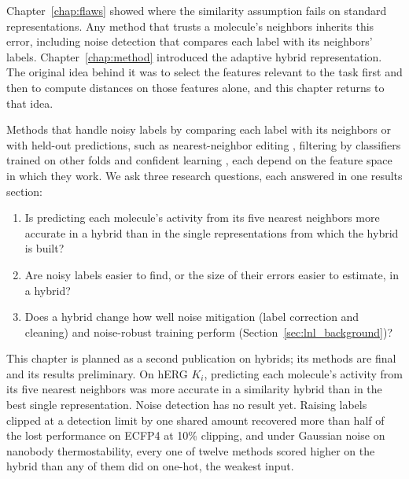 Chapter~\ref{chap:flaws} showed where the similarity assumption fails on standard representations. Any method that trusts a molecule's neighbors inherits this error, including noise detection that compares each label with its neighbors' labels. Chapter~\ref{chap:method} introduced the adaptive hybrid representation. The original idea behind it was to select the features relevant to the task first and then to compute distances on those features alone, and this chapter returns to that idea.

Methods that handle noisy labels by comparing each label with its neighbors or with held-out predictions, such as nearest-neighbor editing \citep{Wilson1972}, filtering by classifiers trained on other folds \citep{Brodley1999} and confident learning \citep{Northcutt2021}, each depend on the feature space in which they work. We ask three research questions, each answered in one results section:
\begin{enumerate}
    \item Is predicting each molecule's activity from its five nearest neighbors more accurate in a hybrid than in the single representations from which the hybrid is built?
    \item Are noisy labels easier to find, or the size of their errors easier to estimate, in a hybrid?
    \item Does a hybrid change how well noise mitigation (label correction and cleaning) and noise-robust training perform (Section~\ref{sec:lnl_background})?
\end{enumerate}

This chapter is planned as a second publication on hybrids; its methods are final and its results preliminary. On hERG $K_i$, predicting each molecule's activity from its five nearest neighbors was more accurate in a similarity hybrid than in the best single representation. Noise detection has no result yet. Raising labels clipped at a detection limit by one shared amount recovered more than half of the lost performance on ECFP4 at 10\% clipping, and under Gaussian noise on nanobody thermostability, every one of twelve methods scored higher on the hybrid than any of them did on one-hot, the weakest input.



